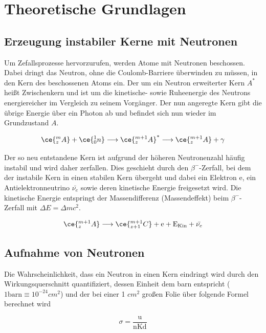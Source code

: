 \section{Theoretische Grundlagen}
    \subsection{Erzeugung instabiler Kerne mit Neutronen}
        Um Zefallsprozesse hervorzurufen, werden Atome mit Neutronen beschossen. Dabei dringt das Neutron, ohne die Coulomb-Barriere überwinden zu müssen, in den Kern des beschossenen Atoms ein. 
        Der um ein Neutron erweiterter Kern $A^*$ heißt Zwischenkern und ist um die kinetische- sowie Ruheenergie des Neutrons energiereicher im Vergleich zu seinem Vorgänger. Der nun angeregte Kern
        gibt die übrige Energie über ein Photon ab und befindet sich nun wieder im Grundzustand $A$.
        
        \begin{equation*}
            \ce{^{m}_{z}A} + \ce{^{1}_{0}n} \longrightarrow \ce{^{m+1}_{z}A}^* \longrightarrow \ce{^{m+1}_{z}A} + \gamma
        \end{equation*}

        \noindent
        Der so neu entstandene Kern ist aufgrund der höheren Neutronenzahl häufig instabil und wird daher zerfallen. Dies geschieht durch den $\beta^-$-Zerfall, bei dem der instabile Kern in einen
        stabilen Kern übergeht und dabei ein Elektron e, ein Antielektronneutrino $\bar{\nu_e}$ sowie deren kinetische Energie freigesetzt wird. Die kinetische Energie entspringt der Massendifferenz
        (Massendeffekt) beim $\beta^-$-Zerfall mit $\Delta E = \Delta mc^2$.

        \begin{equation*}
            \ce{^{m+1}_{z}A} \longrightarrow \ce{^{m+1}_{z+1}C} + \text{e} + \text{E}_{\text{Kin}} + \bar{\nu_e}
        \end{equation*}

    \subsection{Aufnahme von Neutronen}
        Die Wahrscheinlichkeit, dass ein Neutron in einen Kern eindringt wird durch den Wirkungsquerschnitt quantifiziert, dessen Einheit dem barn entspricht ($1 \text{barn} \equiv 10^{-24} cm^2$)
        und der bei einer 1 $cm^2$ großen Folie über folgende Formel berechnet wird
        
        \begin{equation*}
            \sigma = \frac{\text{u}}{\text{nKd}}
        \end{equation*}

